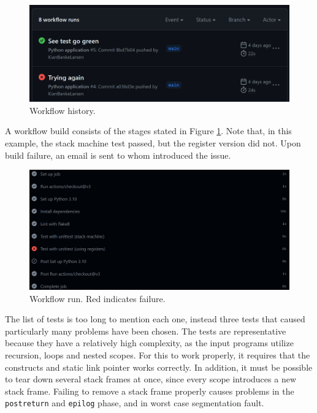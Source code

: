 \begin{figure}[H]
    \centering
    \includegraphics[width=1\textwidth]{misc/images/Workflow.png}
    \caption{Workflow history.}
\end{figure}

A workflow build consists of the stages stated in Figure \ref{fig:workflow_run}.  Note that, in this example, the stack machine test passed, but the register version did not. Upon build failure, an email is sent to whom introduced the issue.

\begin{figure}[H]
    \centering
    \includegraphics[width=1\textwidth]{misc/images/workflow_run.png}
    \caption{Workflow run. Red indicates failure.}
    \label{fig:workflow_run}
\end{figure}

The list of tests is too long to mention each one, instead three tests that caused particularly many problems have been chosen. The tests are representative because they have a relatively high complexity, as the input programs utilize recursion, loops and nested scopes. For this to work properly, it requires that the constructs and static link pointer works correctly. In addition, it must be possible to tear down several stack frames at once, since every scope introduces a new stack frame. Failing to remove a stack frame properly causes problems in the \texttt{postreturn} and \texttt{epilog} phase, and in worst case segmentation fault. 

